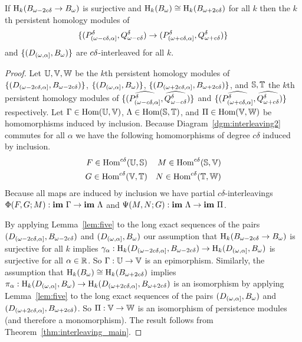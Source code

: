 \begin{lemma}
  If $\mathrm{H}_k(B_{\omega - 2c{\delta}}\to B_{\omega})$ is surjective and $\mathrm{H}_k(B_{\omega})\cong \mathrm{H}_k(B_{\omega + 2c{\delta}})$ for all $k$ then the $k$th persistent homology modules of \[\{(P^{{\delta}}_{(\omega-c{\delta},\alpha]},Q_{\omega - c{\delta}}^{\delta})\to(P^{{\delta}}_{(\omega+c{\delta},\alpha]},Q_{\omega + c{\delta}}^{\delta})\}\] and $\{(D_{(\omega,\alpha]}, B_{\omega})\}$ are $c{\delta}$-interleaved for all $k$.
\end{lemma}
\begin{proof}
  Let $\mathbb{U}, \mathbb{V}, \mathbb{W}$ be the $k$th persistent homology modules of $\{(D_{(\omega-2c{\delta}, \alpha]}, B_{\omega - 2c{\delta}})\}$, $\{(D_{(\omega,\alpha]}, B_{\omega})\}$, $\{(D_{(\omega+2c{\delta},\alpha]}, B_{\omega + 2c{\delta}})\}$, and $\mathbb{S}, \mathbb{T}$ the $k$th persistent homology modules of $\{(\widehat{P^{{\delta}}_{(\omega-c{\delta},\alpha]}},\widehat{Q_{\omega - c{\delta}}^{\delta}})\}$ and $\{(\widehat{P^{{\delta}}_{(\omega+c{\delta},\alpha]}},\widehat{Q_{\omega + c{\delta}}^{\delta}})\}$ respectively.
  Let $\Gamma\in\text{Hom}(\mathbb{U},\mathbb{V})$, $\Lambda\in\text{Hom}(\mathbb{S}, \mathbb{T})$, and $\Pi\in\text{Hom}(\mathbb{V},\mathbb{W})$ be homomorphisms induced by inclusion.
  Because Diagram~\ref{dgm:interleaving2} commutes for all $\alpha$ we have the following homomorphisms of degree $c\delta$ induced by inclusion.
  \begin{align*}
    F\in\text{Hom}^{c\delta}(\mathbb{U},\mathbb{S})& & M\in\text{Hom}^{c\delta}(\mathbb{S},\mathbb{V})\\
    G\in\text{Hom}^{c\delta}(\mathbb{V},\mathbb{T})& & N\in\text{Hom}^{c\delta}(\mathbb{T},\mathbb{W})
  \end{align*}
  Because all maps are induced by inclusion we have partial $c\delta$-interleavings $\Phi(F, G; M) : \mathbf{im}~\Gamma\to \mathbf{im}~\Lambda$ and $\Psi(M, N; G) : \mathbf{im}~\Lambda\to\mathbf{im}~\Pi$.

  By applying Lemma~\ref{lem:five} to the long exact sequences of the pairs $(D_{(\omega-2c{\delta},\alpha]},B_{\omega - 2c{\delta}})$ and $(D_{(\omega,\alpha]},B_{\omega})$ our assumption that $\mathrm{H}_k(B_{\omega - 2c{\delta}}\to B_{\omega})$ is surjective for all $k$ implies $\gamma_\alpha : \mathrm{H}_k(D_{(\omega-2c{\delta},\alpha]},B_{\omega - 2c{\delta}})\to \mathrm{H}_k(D_{(\omega,\alpha]},B_{\omega})$ is surjective for all $\alpha\in\mathbb{R}$.
  So $\Gamma : \mathbb{U}\to \mathbb{V}$ is an epimorphism.
  Similarly, the assumption that $\mathrm{H}_k(B_{\omega})\cong \mathrm{H}_k(B_{\omega + 2c{\delta}})$ implies $\pi_\alpha : \mathrm{H}_k(D_{(\omega,\alpha]},B_{\omega})\to \mathrm{H}_k(D_{(\omega+2c{\delta},\alpha]},B_{\omega + 2c{\delta}})$ is an isomorphism by applying Lemma~\ref{lem:five} to the long exact sequences of the pairs $(D_{(\omega,\alpha]},B_{\omega})$ and $(D_{(\omega+2c{\delta},\alpha]},B_{\omega + 2c{\delta}})$.
  So $\Pi : \mathbb{V}\to\mathbb{W}$ is an isomorphism of persistence modules (and therefore a monomorphism).
  The result follows from Theorem~\ref{thm:interleaving_main}.



\end{proof}
